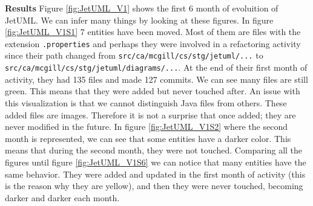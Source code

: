 \textbf{Results}
Figure \ref{fig:JetUML_V1} shows the first 6 month of evoluition of JetUML. 
We can infer many things by looking at these figures. In figure \ref{fig:JetUML_V1S1} 7 entities have been moved. 
Most of them are files with the extension \texttt{.properties} and perhaps they were involved in a refactoring activity since their path changed from
\texttt{src/ca/mcgill/cs/stg/jetuml/...} to \texttt{src/ca/mcgill/cs/stg/jetuml/diagrams/...}. 
At the end of their first month of activity, they had 135 files and made 127 commits. 
We can see many files are still green. This means that they were added but never touched after. 
An issue with this visualization is that we cannot distinguish Java files from others. 
These added files are images. Therefore it is not a surprise that once added; they are never modified in the future. 
In figure \ref{fig:JetUML_V1S2} where the second month is represented, we can see that some entities have a darker color. 
This means that during the second month, they were not touched. 
Comparing all the figures until figure \ref{fig:JetUML_V1S6} we can notice that many entities have the same behavior. 
They were added and updated in the first month of activity (this is the reason why they are yellow), and then they were never touched, becoming darker and darker each month. 

